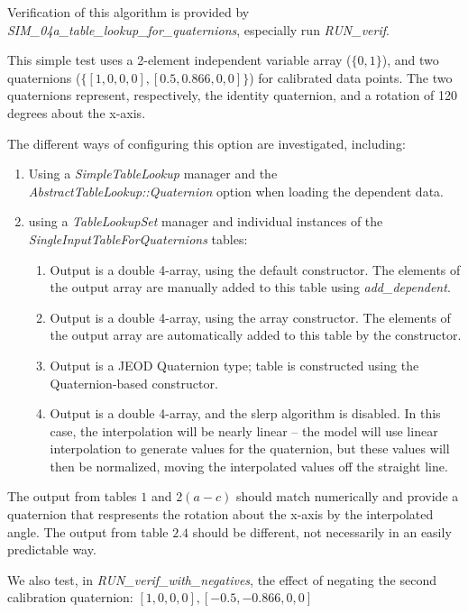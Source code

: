 \documentclass[11pt,fleqn]{report}
\begin{document}
Verification of this algorithm is provided by
\textit{SIM\_04a\_table\_lookup\_for\_quaternions}, especially run
\textit{RUN\_verif}.

This simple test uses a 2-element independent variable array ($\{0,1\}$), and
two quaternions \linebreak
($\{[1, 0, 0, 0] , [0.5, 0.866, 0, 0]\}$) for calibrated data points.
The two quaternions represent, respectively, the identity quaternion,
and a rotation of 120 degrees about the x-axis.

The different ways of configuring this option are investigated, including:
\begin{enumerate}
  \item Using a \textit{SimpleTableLookup} manager and the
  \textit{AbstractTableLookup::Quaternion} option when loading the
  dependent data.
  \item using a \textit{TableLookupSet} manager and individual instances of
  the \textit{SingleInputTableForQuaternions} tables:
  \begin{enumerate}
    \item Output is a double 4-array, using the default constructor.
    The elements of the
    output array are manually added to this table using
    \textit{add\_dependent}.
    \item Output is a double 4-array, using the array constructor.
    The elements of the output array are automatically added to this table
    by the constructor.
    \item Output is a JEOD Quaternion type; table is constructed using the
    Quaternion-based constructor.
    \item Output is a double 4-array, and the slerp algorithm is disabled.
    In this case, the interpolation will be nearly linear -- the model will
    use linear interpolation to generate values for the quaternion, but
    these values will then be normalized, moving
    the interpolated values off the straight line.
  \end{enumerate}
\end{enumerate}

The output from tables $1$ and $2(a-c)$ should match
numerically and provide a quaternion that respresents the rotation about the
x-axis by the interpolated angle.  The output from table $2.4$ should be
different, not necessarily in an easily predictable way.

We also test, in \textit{RUN\_verif\_with\_negatives}, the effect of
negating the second calibration quaternion:
${[1, 0, 0, 0] , [-0.5, -0.866, 0, 0]}$
\end{document}
